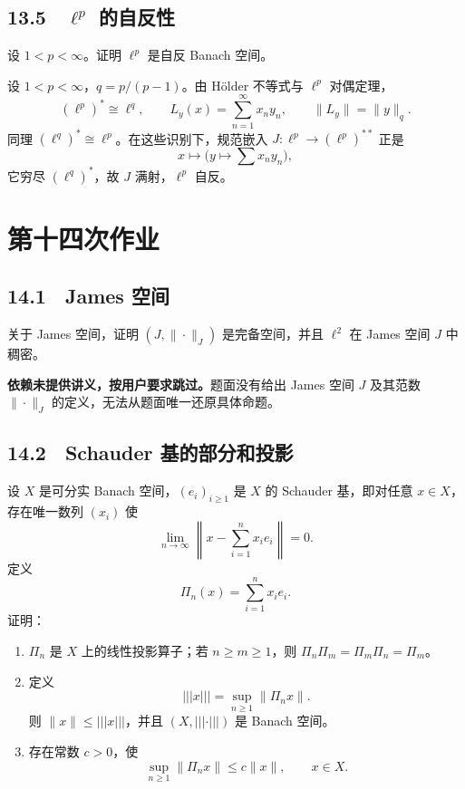 \subsection*{13.5　$\ell^p$ 的自反性}

\begin{problem}
设 $1<p<\infty$。证明 $\ell^p$ 是自反 Banach 空间。
\end{problem}

设 $1<p<\infty$，$q=p/(p-1)$。由 H\"older 不等式与 $\ell^p$ 对偶定理，
\[
 (\ell^p)^*\cong\ell^q,\qquad
 L_y(x)=\sum_{n=1}^\infty x_ny_n,\qquad \|L_y\|=\|y\|_q.
\]
同理 $(\ell^q)^*\cong\ell^p$。在这些识别下，规范嵌入
$J:\ell^p\to(\ell^p)^{**}$ 正是
\[
 x\longmapsto\bigl(y\mapsto\sum x_ny_n\bigr),
\]
它穷尽 $(\ell^q)^*$，故 $J$ 满射，$\ell^p$ 自反。

\section{第十四次作业}

\subsection*{14.1　James 空间}

\begin{problem}
关于 James 空间，证明 $(J,\|\cdot\|_J)$ 是完备空间，并且 $\ell^2$ 在 James 空间
$J$ 中稠密。
\end{problem}

\textbf{依赖未提供讲义，按用户要求跳过。}题面没有给出 James 空间 $J$ 及其范数
$\|\cdot\|_J$ 的定义，无法从题面唯一还原具体命题。

\subsection*{14.2　Schauder 基的部分和投影}

\begin{problem}
设 $X$ 是可分实 Banach 空间，$(e_i)_{i\ge1}$ 是 $X$ 的 Schauder 基，即对任意
$x\in X$，存在唯一数列 $(x_i)$ 使
\[
 \lim_{n\to\infty}\left\|x-\sum_{i=1}^nx_ie_i\right\|=0.
\]
定义
\[
 \Pi_n(x)=\sum_{i=1}^nx_ie_i.
\]
证明：
\begin{enumerate}
 \item $\Pi_n$ 是 $X$ 上的线性投影算子；若 $n\ge m\ge1$，则
 $\Pi_n\Pi_m=\Pi_m\Pi_n=\Pi_m$。
 \item 定义
 \[
  |||x|||=\sup_{n\ge1}\|\Pi_nx\|.
 \]
 则 $\|x\|\le|||x|||$，并且 $(X,|||\cdot|||)$ 是 Banach 空间。
 \item 存在常数 $c>0$，使
 \[
  \sup_{n\ge1}\|\Pi_nx\|\le c\|x\|,\qquad x\in X.
 \]
\end{enumerate}
\end{problem}

